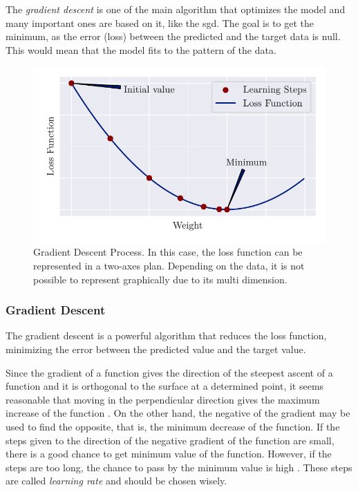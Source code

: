 The \emph{gradient descent} is one of the main algorithm \citep{nesterov2004} that optimizes the model and many important ones are based on it, like the \gls*{sgd}. The goal is to get the minimum, as the error (loss) between the predicted and the target data is null. This would mean that the model fits to the pattern of the data.
%
\begin{figure}[H]
    \centering
    \includegraphics{figures/2review/nn/gradient_descent.pdf}
    \caption[Gradient Descent Process]{Gradient Descent Process. In this case, the loss function can be represented in a two-axes plan. Depending on the data, it is not possible to represent graphically due to its multi dimension.}
\end{figure}

\subsubsection*{Gradient Descent}

The gradient descent is a powerful algorithm that reduces the loss function, minimizing the error between the predicted value and the target value.

Since the gradient of a function gives the direction of the steepest ascent of a function and it is orthogonal to the surface at a determined point, it seems reasonable that moving in the perpendicular direction gives the maximum increase of the function \cite{stewart2016}.
On the other hand, the negative of the gradient may be used to find the opposite, that is, the minimum decrease of the function.
If the steps given to the direction of the negative gradient of the function are small, there is a good chance to get minimum value of the function.
However, if the steps are too long, the chance to pass by the minimum value is high \citep{nielsen2015}.
These steps are called \emph{learning rate} and should be chosen wisely.

